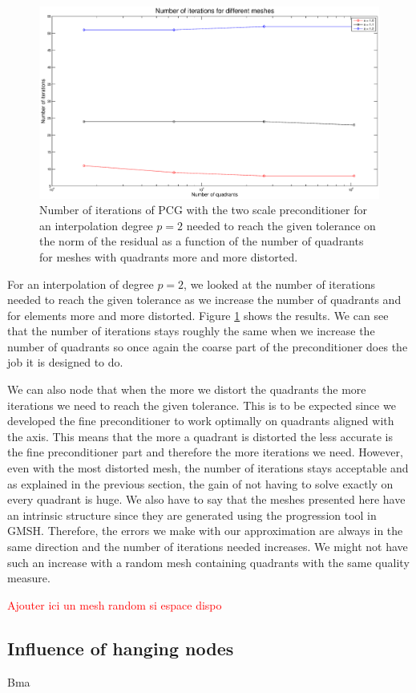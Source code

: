 \begin{figure}
\centering
\includegraphics[scale=0.35]{Results/two_irreg_iter.eps}
\caption{Number of iterations of PCG with the two scale preconditioner for an interpolation degree $p=2$ needed to reach the given tolerance on the norm of the residual as a function of the number of quadrants for meshes with quadrants more and more distorted.}
\label{two_irreg_iter}
\end{figure}

For an interpolation of degree $p=2$, we looked at the number of iterations needed to reach the given tolerance as we increase the number of quadrants and for elements more and more distorted. Figure \ref{two_irreg_iter} shows the results. We can see that the number of iterations stays roughly the same when we increase the number of quadrants so once again the coarse part of the preconditioner does the job it is designed to do. 

We can also node that when the more we distort the quadrants the more iterations we need to reach the given tolerance. This is to be expected since we developed the fine preconditioner to work optimally on quadrants aligned with the axis. This means that the more a quadrant is distorted the less accurate is the fine preconditioner part and therefore the more iterations we need. However, even with the most distorted mesh, the number of iterations stays acceptable and as explained in the previous section, the gain of not having to solve exactly on every quadrant is huge. We also have to say that the meshes presented here have an intrinsic structure since they are generated using the progression tool in GMSH. Therefore, the errors we make with our approximation are always in the same direction and the number of iterations needed increases. We might not have such an increase with a random mesh containing quadrants with the same quality measure. 

\textcolor{red}{Ajouter ici un mesh random si espace dispo}

\subsection{Influence of hanging nodes}

Bma